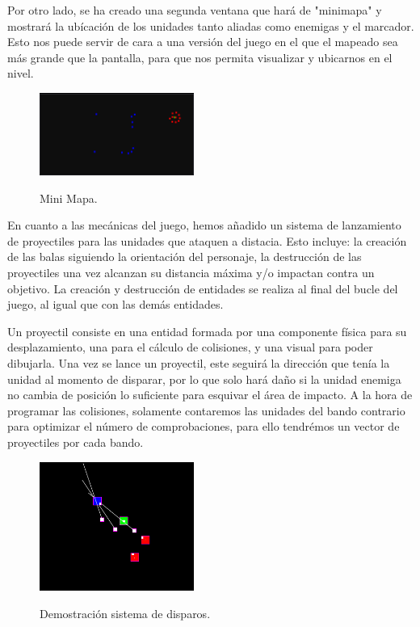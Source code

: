 Por otro lado, se ha creado una segunda ventana que hará de "minimapa" y mostrará la ubícación de los unidades
tanto aliadas como enemigas y el marcador. Esto nos puede servir de cara a una versión del juego en el que el
mapeado sea más grande que la pantalla, para que nos permita visualizar y ubicarnos en el nivel.

\begin{figure}[htb]
\centering
\includegraphics[width=0.45\textwidth]{imagenes/diario_desarrollo/minimap.png}\\
\caption{Mini Mapa.}
\label{fig:minimap}
\end{figure}

En cuanto a las mecánicas del juego, hemos añadido un sistema de lanzamiento de proyectiles para las unidades
que ataquen a distacia. Esto incluye: la creación de las balas siguiendo la orientación del personaje, la
destrucción de las proyectiles una vez alcanzan su distancia máxima y/o impactan contra un objetivo.
La creación y destrucción de entidades se realiza al final del bucle del juego, al igual que con las
demás entidades. 

Un proyectil consiste en una entidad formada por una componente física para su desplazamiento, una para el
cálculo de colisiones, y una visual para poder dibujarla. Una vez se lance un proyectil, este seguirá la
dirección que tenía la unidad al momento de disparar, por lo que solo hará daño si la unidad enemiga no 
cambia de posición lo suficiente para esquivar el área de impacto. A la hora de programar las colisiones,
solamente contaremos las unidades del bando contrario para optimizar el número de comprobaciones, para ello
tendrémos un vector de proyectiles por cada bando.

\begin{figure}[htb]
\centering
\includegraphics[width=0.45\textwidth]{imagenes/diario_desarrollo/balas.png}\\
\caption{Demostración sistema de disparos.}
\label{fig:balas}
\end{figure}

